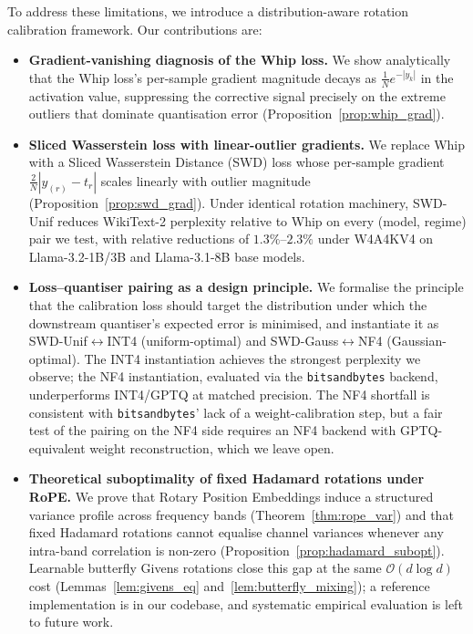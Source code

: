 \documentclass[11pt,a4paper]{article}
\begin{document}
To address these limitations, we introduce a distribution-aware rotation calibration framework. Our contributions are:
\begin{itemize}
    \item \textbf{Gradient-vanishing diagnosis of the Whip loss.} We show analytically that the Whip loss's per-sample gradient magnitude decays as $\frac{1}{N}e^{-|y_k|}$ in the activation value, suppressing the corrective signal precisely on the extreme outliers that dominate quantisation error (Proposition~\ref{prop:whip_grad}).
    \item \textbf{Sliced Wasserstein loss with linear-outlier gradients.} We replace Whip with a Sliced Wasserstein Distance (SWD) loss whose per-sample gradient $\frac{2}{N}|y_{(r)}-t_r|$ scales linearly with outlier magnitude (Proposition~\ref{prop:swd_grad}). Under identical rotation machinery, SWD-Unif reduces WikiText-2 perplexity relative to Whip on every (model, regime) pair we test, with relative reductions of $1.3\%$--$2.3\%$ under W4A4KV4 on Llama-3.2-1B/3B and Llama-3.1-8B base models.
    \item \textbf{Loss--quantiser pairing as a design principle.} We formalise the principle that the calibration loss should target the distribution under which the downstream quantiser's expected error is minimised, and instantiate it as SWD-Unif$\leftrightarrow$INT4 (uniform-optimal) and SWD-Gauss$\leftrightarrow$NF4 (Gaussian-optimal). The INT4 instantiation achieves the strongest perplexity we observe; the NF4 instantiation, evaluated via the \texttt{bitsandbytes} backend, underperforms INT4/GPTQ at matched precision. The NF4 shortfall is consistent with \texttt{bitsandbytes}' lack of a weight-calibration step, but a fair test of the pairing on the NF4 side requires an NF4 backend with GPTQ-equivalent weight reconstruction, which we leave open.
    \item \textbf{Theoretical suboptimality of fixed Hadamard rotations under RoPE.} We prove that Rotary Position Embeddings induce a structured variance profile across frequency bands (Theorem~\ref{thm:rope_var}) and that fixed Hadamard rotations cannot equalise channel variances whenever any intra-band correlation is non-zero (Proposition~\ref{prop:hadamard_subopt}). Learnable butterfly Givens rotations close this gap at the same $\mathcal{O}(d\log d)$ cost (Lemmas~\ref{lem:givens_eq} and~\ref{lem:butterfly_mixing}); a reference implementation is in our codebase, and systematic empirical evaluation is left to future work.
\end{itemize}
\end{document}

